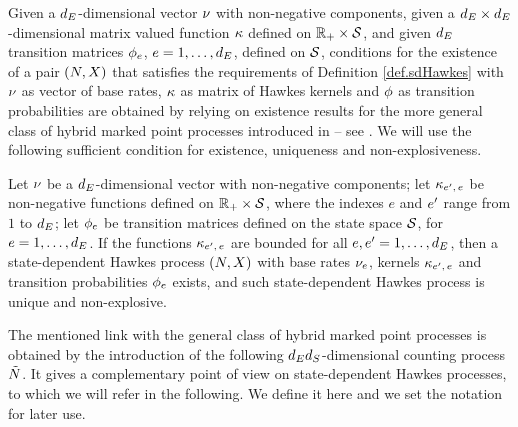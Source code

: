 \documentclass[10pt, article,table]{article}
\begin{document}
Given a $d_{E}$-dimensional vector $\nu$ with non-negative components, given a $d_{E}\times d_{E}$-dimensional matrix valued function $\kappa$ defined on $\mathbb{R}_{+} \times \mathcal{S}$, and given $d_{E}$ transition matrices $\phi_e$, $e=1,\dots,d_{E}$, defined on $\mathcal{S}$, conditions for the existence of a pair $(N,X)$ that satisfies the requirements of Definition \ref{def.sdHawkes} with $\nu$ as vector of base rates, $\kappa$ as matrix of Hawkes kernels and $\phi$ as transition probabilities are obtained by relying on existence results for the more general class of hybrid marked point processes introduced in \citealp{MP20hyb} -- see \citealp[Theorem 2.3]{MP18sta}. We will use the following sufficient condition for existence, uniqueness and non-explosiveness.
\begin{prop}\label{prop.existence_sdHawkes}
 Let $\nu$ be a $d_{E}$-dimensional vector with non-negative components; let $\kappa_{e^{\prime},\, e}$ be non-negative functions defined on $\mathbb{R}_{+} \times \mathcal{S}$, where the indexes $e$ and $e^{\prime}$ range from $1$ to $d_{E}$; let $\phi_e$ be transition matrices defined on the state space $\mathcal{S}$, for $e=1,\dots,d_{E}$. If the functions $\kappa_{e^{\prime},\, e}$ are bounded for all $e,e^{\prime}=1,\dots,d_{E}$, then a state-dependent Hawkes process $(N, X)$ with base rates $\nu_e$, kernels $\kappa_{e^{\prime},\, e}$ and transition probabilities $\phi_e$ exists, and such state-dependent Hawkes process is unique and non-explosive. 
\end{prop}

The mentioned link with the general class of hybrid marked point processes is obtained by the introduction of the following $d_{E}d_{S}$-dimensional counting process $\tilde{N}$. It gives a complementary point of view on state-dependent Hawkes processes, to which we will refer in the following. We define it here and we set the notation for later use.
\end{document}
